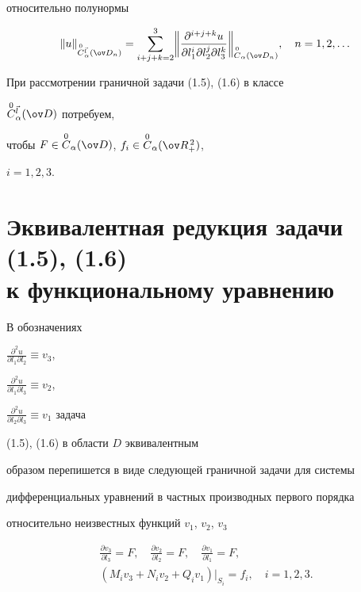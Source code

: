 относительно полунормы


$$


\|u\|_{\OC^{\Vec l}_\alpha(\ov D_n)}=\sum^3_{i+j+k=2}


\biggl\|


\frac{\partial^{i+j+k}u}{\partial l^i_1\partial l^j_2\partial l^k_3}


\biggr\|_{\OC_\alpha(\ov D_n)},\quad n=1,2,\dotsc


$$


При рассмотрении граничной задачи (1.5), (1.6) в классе


$\OC^{\Vec l}_\alpha(\ov D)$ потребуем,


чтобы $F\in\OC_\alpha(\ov D)$, $f_i\in\OC_\alpha(\ov R^{\,2}_+)$,


$i=1,2,3$.





\section{Эквивалентная редукция задачи (1.5), (1.6)\protect\\


к функциональному уравнению}





В обозначениях


$\frac{\partial^2u}{\partial l_1\partial l_2}\equiv v_3$,


$\frac{\partial^2u}{\partial l_1\partial l_3}\equiv v_2$,


$\frac{\partial^2u}{\partial l_2\partial l_3}\equiv v_1$ задача


(1.5), (1.6) в области $D$ эквивалентным


образом перепишется в виде следующей граничной задачи для системы


дифференциальных уравнений в частных производных первого порядка


относительно неизвестных функций $v_1$, $v_2$, $v_3$


\begin{gather}


\frac{\partial v_3}{\partial l_3}=F,\quad


\frac{\partial v_2}{\partial l_2}=F,\quad


\frac{\partial v_1}{\partial l_1}=F, \\


(M_i v_3+N_i v_2+Q_i v_1)\big|_{S_i}=f_i,\quad i=1,2,3.


\end{gather}





